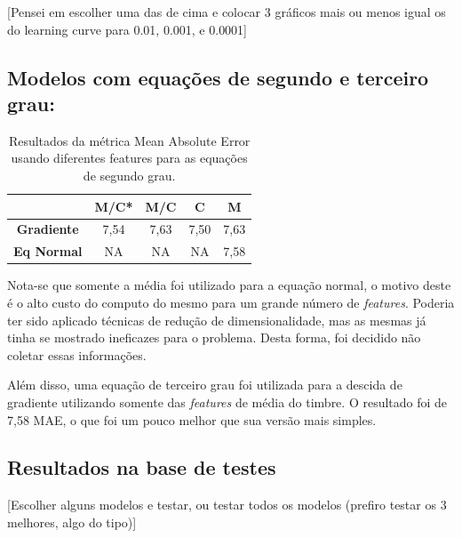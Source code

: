 \documentclass[conference]{IEEEtran}
\begin{document}
[Pensei em escolher uma das de cima e colocar 3 gráficos mais ou menos igual os do learning curve para 0.01, 0.001, e 0.0001]

\subsection{Modelos com equações de segundo e terceiro grau: }

\begin{table}[!h]
	\centering
	
	\begin{tabular}{ccccc} \\ \hline
		\backslashbox{\textbf{Modelos}}{\textbf{Features}} & \textbf{M/C*} & \textbf{M/C} & \textbf{C} & \textbf{M} \\ \hline
		\textbf{Gradiente}      & 7,54     & 7,63         & 7,50       & 7,63  \\  
		\textbf{Eq Normal}      & NA       & NA         & NA       & 7,58   
	\end{tabular}
	\caption{Resultados da métrica Mean Absolute Error usando diferentes features para as equações de segundo grau.}
	\label{tab:comp}
\end{table}

Nota-se que somente a média foi utilizado para a equação normal, o motivo deste é o alto custo do computo do mesmo para um grande número de \emph{features}. Poderia ter sido aplicado técnicas de redução de dimensionalidade, mas as mesmas já tinha se mostrado ineficazes para o problema. Desta forma, foi decidido não coletar essas informações.

Além disso, uma equação de terceiro grau foi utilizada para a descida de gradiente utilizando somente das \emph{features} de média do timbre. O resultado foi de 7,58 MAE, o que foi um pouco melhor que sua versão mais simples.

\subsection{Resultados na base de testes }

[Escolher alguns modelos e testar, ou testar todos os modelos (prefiro testar os 3 melhores, algo do tipo)]


\end{document}
